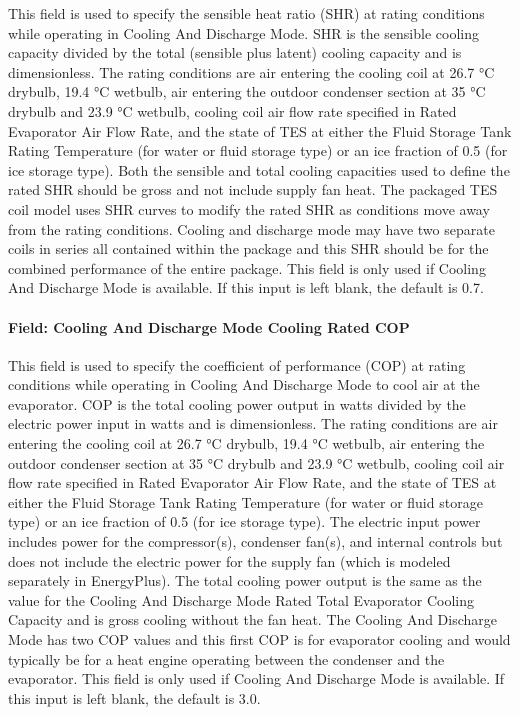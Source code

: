 This field is used to specify the sensible heat ratio (SHR) at rating conditions while operating in Cooling And Discharge Mode. SHR is the sensible cooling capacity divided by the total (sensible plus latent) cooling capacity and is dimensionless. The rating conditions are air entering the cooling coil at 26.7 °C drybulb, 19.4 °C wetbulb, air entering the outdoor condenser section at 35 °C drybulb and 23.9 °C wetbulb, cooling coil air flow rate specified in Rated Evaporator Air Flow Rate, and the state of TES at either the Fluid Storage Tank Rating Temperature (for water or fluid storage type) or an ice fraction of 0.5 (for ice storage type). Both the sensible and total cooling capacities used to define the rated SHR should be gross and not include supply fan heat. The packaged TES coil model uses SHR curves to modify the rated SHR as conditions move away from the rating conditions. Cooling and discharge mode may have two separate coils in series all contained within the package and this SHR should be for the combined performance of the entire package. This field is only used if Cooling And Discharge Mode is available. If this input is left blank, the default is 0.7.

\paragraph{Field: Cooling And Discharge Mode Cooling Rated COP}\label{field-cooling-and-discharge-mode-cooling-rated-cop}

This field is used to specify the coefficient of performance (COP) at rating conditions while operating in Cooling And Discharge Mode to cool air at the evaporator. COP is the total cooling power output in watts divided by the electric power input in watts and is dimensionless. The rating conditions are air entering the cooling coil at 26.7 °C drybulb, 19.4 °C wetbulb, air entering the outdoor condenser section at 35 °C drybulb and 23.9 °C wetbulb, cooling coil air flow rate specified in Rated Evaporator Air Flow Rate, and the state of TES at either the Fluid Storage Tank Rating Temperature (for water or fluid storage type) or an ice fraction of 0.5 (for ice storage type). The electric input power includes power for the compressor(s), condenser fan(s), and internal controls but does not include the electric power for the supply fan (which is modeled separately in EnergyPlus). The total cooling power output is the same as the value for the Cooling And Discharge Mode Rated Total Evaporator Cooling Capacity and is gross cooling without the fan heat. The Cooling And Discharge Mode has two COP values and this first COP is for evaporator cooling and would typically be for a heat engine operating between the condenser and the evaporator. This field is only used if Cooling And Discharge Mode is available. If this input is left blank, the default is 3.0.

